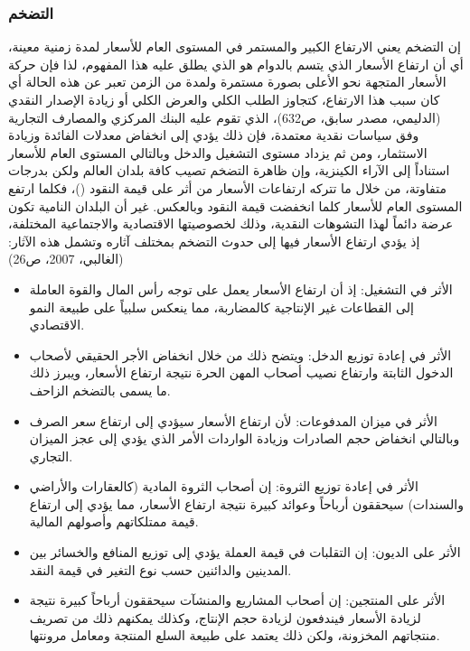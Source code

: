 \documentclass[10pt,a4paper]{report}
\begin{document}
\begin{doublespacing}
\subsubsection{التضخم}
إن التضخم يعني الارتفاع الكبير والمستمر في المستوى العام للأسعار لمدة زمنية معينة، أي أن ارتفاع الأسعار الذي يتسم بالدوام هو الذي يطلق عليه هذا المفهوم، لذا فإن حركة الأسعار المتجهة نحو الأعلى بصورة مستمرة ولمدة من الزمن تعبر عن هذه الحالة أي كان سبب هذا الارتفاع، كتجاوز الطلب الكلي والعرض الكلي أو زيادة الإصدار النقدي ({الدليمي، مصدر سابق، ص632})، الذي تقوم عليه البنك المركزي والمصارف التجارية وفق سياسات نقدية معتمدة، فإن ذلك يؤدي إلى انخفاض معدلات الفائدة وزيادة الاستثمار، ومن ثم يزداد مستوى التشغيل والدخل وبالتالي المستوى العام للأسعار استناداً إلى الآراء الكينزية، وإن ظاهرة التضخم تصيب كافة بلدان العالم ولكن بدرجات متفاوتة، من خلال ما تتركه ارتفاعات الأسعار من أثر على قيمة النقود ()، فكلما ارتفع المستوى العام للأسعار كلما انخفضت قيمة النقود وبالعكس. غير أن البلدان النامية تكون عرضة دائماً لهذا التشوهات النقدية، وذلك لخصوصيتها الاقتصادية والاجتماعية المختلفة، إذ يؤدي ارتفاع الأسعار فيها إلى حدوث التضخم بمختلف آثاره وتشمل هذه الآثار: ({الغالبي، 2007، ص26})
\begin{itemize}
	\item الأثر في التشغيل: إذ أن ارتفاع الأسعار يعمل على توجه رأس المال والقوة العاملة إلى القطاعات غير الإنتاجية كالمضاربة، مما ينعكس سلبياً على طبيعة النمو الاقتصادي.
	\item الأثر في إعادة توزيع الدخل: ويتضح ذلك من خلال انخفاض الأجر الحقيقي لأصحاب الدخول الثابتة وارتفاع نصيب أصحاب المهن الحرة نتيجة ارتفاع الأسعار، ويبرز ذلك ما يسمى بالتضخم الزاحف.
	\item الأثر في ميزان المدفوعات: لأن ارتفاع الأسعار سيؤدي إلى ارتفاع سعر الصرف وبالتالي انخفاض حجم الصادرات وزيادة الواردات الأمر الذي يؤدي إلى عجز الميزان التجاري.
	\item الأثر في إعادة توزيع الثروة: إن أصحاب الثروة المادية (كالعقارات والأراضي والسندات) سيحققون أرباحاً وعوائد كبيرة نتيجة ارتفاع الأسعار، مما يؤدي إلى ارتفاع قيمة ممتلكاتهم وأصولهم المالية.
	\item الأثر على الديون: إن التقلبات في قيمة العملة يؤدي إلى توزيع المنافع والخسائر بين المدينين والدائنين حسب نوع التغير في قيمة النقد.
	\item الأثر على المنتجين: إن أصحاب المشاريع والمنشآت سيحققون أرباحاً كبيرة نتيجة لزيادة الأسعار فيندفعون لزيادة حجم الإنتاج، وكذلك يمكنهم ذلك من تصريف منتجاتهم المخزونة، ولكن ذلك يعتمد على طبيعة السلع المنتجة ومعامل مرونتها.
\end{itemize}
\clearpage

\end{doublespacing}
\end{document}
